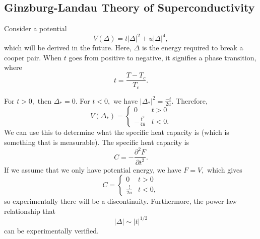 \documentclass{article}
\numberwithin{equation}{section}
\begin{document}
\subsection{Ginzburg-Landau Theory of Superconductivity}
Consider a potential 
\begin{equation}
    V(\Delta) = t|\Delta|^2 + u|\Delta|^4,
\end{equation}
which will be derived in the future. Here, $\Delta$ is the energy required to break a cooper pair. When $t$ goes from positive to negative, it signifies a phase transition, where
\begin{equation*}
    t = \frac{T-T_c}{T_c}.
\end{equation*}
\begin{center}
\end{center}
For $t>0,$ then $\Delta_* =0.$ For $t<0,$ we have $|\Delta_*|^2 = \frac{-t}{2u}.$ Therefore,
\begin{equation*}
    V(\Delta_*) = \begin{cases}
        0 & t>0 \\ 
        -\frac{t^2}{4u} & t<0.
    \end{cases}
\end{equation*}
We can use this to determine what the specific heat capacity is (which is something that is measurable). The specific heat capacity is 
\begin{equation*}
    C = -\frac{\partial^2 F}{\partial t^2}.
\end{equation*}
If we assume that we only have potential energy, we have $F = V,$ which gives 
\begin{equation*}
    C = \begin{cases}
        0 & t>0 \\ 
        \frac{!}{2u} & t< 0,
    \end{cases}
\end{equation*}
so experimentally there will be a discontinuity. Furthermore, the power law relationship that 
\begin{equation*}
    |\Delta| \sim |t|^{1/2}
\end{equation*}
can be experimentally verified.
\end{document}
